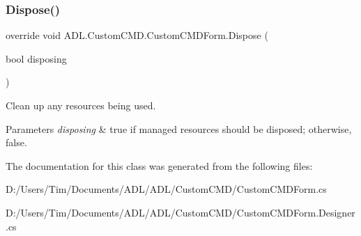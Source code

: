 \subsubsection{\texorpdfstring{Dispose()}{Dispose()}}
{\footnotesize\ttfamily override void A\+D\+L.\+Custom\+C\+M\+D.\+Custom\+C\+M\+D\+Form.\+Dispose (\begin{DoxyParamCaption}\item[{bool}]{disposing }\end{DoxyParamCaption})\hspace{0.3cm}{\ttfamily [protected]}}



Clean up any resources being used. 


\begin{DoxyParams}{Parameters}
{\em disposing} & true if managed resources should be disposed; otherwise, false.\\
\hline
\end{DoxyParams}


The documentation for this class was generated from the following files\+:\begin{DoxyCompactItemize}
\item 
D\+:/\+Users/\+Tim/\+Documents/\+A\+D\+L/\+A\+D\+L/\+Custom\+C\+M\+D/Custom\+C\+M\+D\+Form.\+cs\item 
D\+:/\+Users/\+Tim/\+Documents/\+A\+D\+L/\+A\+D\+L/\+Custom\+C\+M\+D/Custom\+C\+M\+D\+Form.\+Designer.\+cs\end{DoxyCompactItemize}
